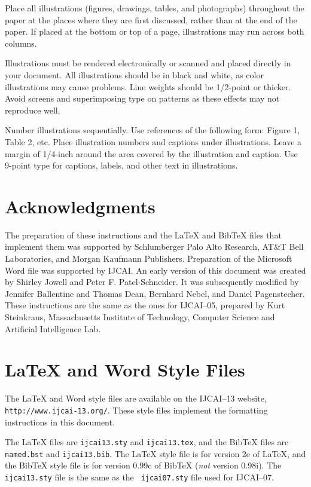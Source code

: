 \documentclass{article}
\begin{document}
Place all illustrations (figures, drawings, tables, and photographs)
throughout the paper at the places where they are first discussed,
rather than at the end of the paper. If placed at the bottom or top of
a page, illustrations may run across both columns.

Illustrations must be rendered electronically or scanned and placed
directly in your document. All illustrations should be in black and
white, as color illustrations may cause problems. Line weights should
be 1/2-point or thicker. Avoid screens and superimposing type on
patterns as these effects may not reproduce well.

Number illustrations sequentially. Use references of the following
form: Figure 1, Table 2, etc. Place illustration numbers and captions
under illustrations. Leave a margin of 1/4-inch around the area
covered by the illustration and caption.  Use 9-point type for
captions, labels, and other text in illustrations.

\section*{Acknowledgments}

The preparation of these instructions and the \LaTeX{} and Bib\TeX{}
files that implement them was supported by Schlumberger Palo Alto
Research, AT\&T Bell Laboratories, and Morgan Kaufmann Publishers.
Preparation of the Microsoft Word file was supported by IJCAI.  An
early version of this document was created by Shirley Jowell and Peter
F. Patel-Schneider.  It was subsequently modified by Jennifer
Ballentine and Thomas Dean, Bernhard Nebel, and Daniel Pagenstecher.
These instructions are the same as the ones for IJCAI--05, prepared by
Kurt Steinkraus, Massachusetts Institute of Technology, Computer
Science and Artificial Intelligence Lab.

\appendix

\section{\LaTeX{} and Word Style Files}\label{stylefiles}

The \LaTeX{} and Word style files are available on the IJCAI--13
website, {\tt http://www.ijcai-13.org/}.
These style files implement the formatting instructions in this
document.

The \LaTeX{} files are {\tt ijcai13.sty} and {\tt ijcai13.tex}, and
the Bib\TeX{} files are {\tt named.bst} and {\tt ijcai13.bib}. The
\LaTeX{} style file is for version 2e of \LaTeX{}, and the Bib\TeX{}
style file is for version 0.99c of Bib\TeX{} ({\em not} version
0.98i). The {\tt ijcai13.sty} file is the same as the {\tt
ijcai07.sty} file used for IJCAI--07.
\end{document}
